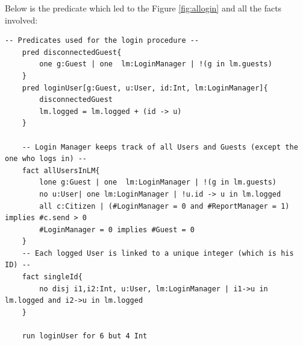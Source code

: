 \documentclass{report}
\begin{document}
Below is the predicate which led to the Figure \ref{fig:allogin} and all the facts involved:
\begin{lstlisting}[language=alloy]
	-- Predicates used for the login procedure --
	pred disconnectedGuest{
		one g:Guest | one  lm:LoginManager | !(g in lm.guests)
	}
	pred loginUser[g:Guest, u:User, id:Int, lm:LoginManager]{
		disconnectedGuest
		lm.logged = lm.logged + (id -> u) 
	}

	-- Login Manager keeps track of all Users and Guests (except the one who logs in) --
	fact allUsersInLM{
		lone g:Guest | one  lm:LoginManager | !(g in lm.guests)
		no u:User| one lm:LoginManager | !u.id -> u in lm.logged
		all c:Citizen | (#LoginManager = 0 and #ReportManager = 1) implies #c.send > 0
		#LoginManager = 0 implies #Guest = 0
	}	
	-- Each logged User is linked to a unique integer (which is his ID) --
	fact singleId{
		no disj i1,i2:Int, u:User, lm:LoginManager | i1->u in lm.logged and i2->u in lm.logged 
	}

	run loginUser for 6 but 4 Int
\end{lstlisting}
\end{document}
